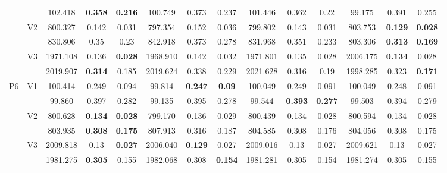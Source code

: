 \documentclass[12pt,a4paper]{article}
\begin{document}
\begin{sidewaystable}[ht]
{\begin{tabular}{cc|ccc|ccc|ccc|ccc|}
   &  & 102.418 & \textbf{0.358} & \textbf{0.216} & 100.749 & 0.373 & 0.237 & 101.446 & 0.362 & 0.22 & 99.175 & 0.391 & 0.255 \\ 
   & \multirow{2}{*}{V2} & 800.327 & 0.142 & 0.031 & 797.354 & 0.152 & 0.036 & 799.802 & 0.143 & 0.031 & 803.753 & \textbf{0.129} & \textbf{0.028} \\ 
   &  & 830.806 & 0.35 & 0.23 & 842.918 & 0.373 & 0.278 & 831.968 & 0.351 & 0.233 & 803.306 & \textbf{0.313} & \textbf{0.169} \\ 
   & \multirow{2}{*}{V3} & 1971.108 & 0.136 & \textbf{0.028} & 1968.910 & 0.142 & 0.032 & 1971.801 & 0.135 & 0.028 & 2006.175 & \textbf{0.134} & 0.028 \\ 
   &  & 2019.907 & \textbf{0.314} & 0.185 & 2019.624 & 0.338 & 0.229 & 2021.628 & 0.316 & 0.19 & 1998.285 & 0.323 & \textbf{0.171} \\ 
   \hline \hline\multirow{6}{*}{P6} & \multirow{2}{*}{V1} & 100.414 & 0.249 & 0.094 & 99.814 & \textbf{0.247} & \textbf{0.09} & 100.049 & 0.249 & 0.091 & 100.049 & 0.248 & 0.091 \\ 
   &  & 99.860 & 0.397 & 0.282 & 99.135 & 0.395 & 0.278 & 99.544 & \textbf{0.393} & \textbf{0.277} & 99.503 & 0.394 & 0.279 \\ 
   & \multirow{2}{*}{V2} & 800.628 & \textbf{0.134} & \textbf{0.028} & 799.170 & 0.136 & 0.029 & 800.439 & 0.134 & 0.028 & 800.594 & 0.134 & 0.028 \\ 
   &  & 803.935 & \textbf{0.308} & \textbf{0.175} & 807.913 & 0.316 & 0.187 & 804.585 & 0.308 & 0.176 & 804.056 & 0.308 & 0.175 \\ 
   & \multirow{2}{*}{V3} & 2009.818 & 0.13 & \textbf{0.027} & 2006.040 & \textbf{0.129} & 0.027 & 2009.016 & 0.13 & 0.027 & 2009.621 & 0.13 & 0.027 \\ 
   &  & 1981.275 & \textbf{0.305} & 0.155 & 1982.068 & 0.308 & \textbf{0.154} & 1981.281 & 0.305 & 0.154 & 1981.274 & 0.305 & 0.155 \\ 
   \hline
\end{tabular}
}
\end{sidewaystable}
\end{document}
